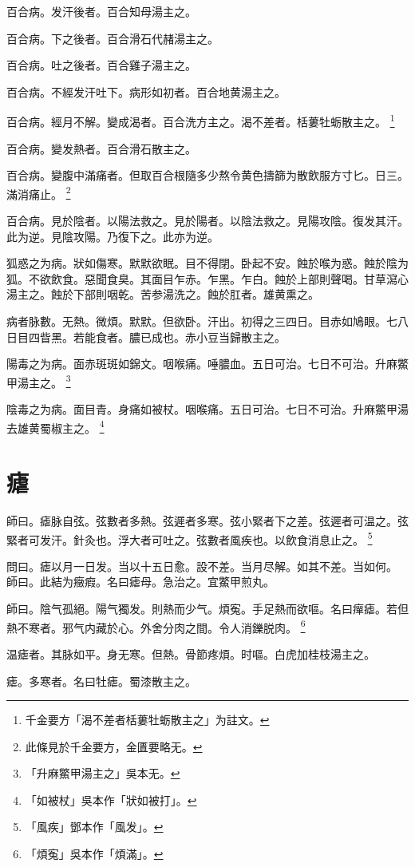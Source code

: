 百合病。发汗後者。百合知母湯主之。

百合病。下之後者。百合滑石代赭湯主之。

百合病。吐之後者。百合雞子湯主之。

百合病。不經发汗吐下。病形如初者。百合地黄湯主之。

百合病。經月不解。變成渴者。百合洗方主之。渴不差者。栝蔞牡蛎散主之。
	\footnote{千金要方「渴不差者栝蔞牡蛎散主之」为註文。}

百合病。變发熱者。百合滑石散主之。

百合病。變腹中滿痛者。但取百合根隨多少熬令黄色擣篩为散飲服方寸匕。日三。滿消痛止。
	\footnote{此條見於千金要方，金匱要略无。}

百合病。見於陰者。以陽法救之。見於陽者。以陰法救之。見陽攻陰。復发其汗。此为逆。見陰攻陽。乃復下之。此亦为逆。

狐惑之为病。狀如傷寒。默默欲眠。目不得閉。卧起不安。蝕於喉为惑。蝕於陰为狐。不欲飲食。惡聞食臭。其面目乍赤。乍黑。乍白。蝕於上部則聲喝。甘草瀉心湯主之。蝕於下部則咽乾。苦参湯洗之。蝕於肛者。雄黄熏之。

病者脉數。无熱。微煩。默默。但欲卧。汗出。初得之三四日。目赤如鳩眼。七八日目四眥黑。若能食者。膿已成也。赤{\khaaitp 小}豆当歸散主之。

陽毒之为病。面赤斑斑如錦文。咽喉痛。唾膿血。五日可治。七日不可治。升麻鱉甲湯主之。
	\footnote{「升麻鱉甲湯主之」吳本无。}

陰毒之为病。面目青。身痛如被杖。咽喉痛。五日可治。七日不可治。升麻鱉甲湯去雄黄蜀椒主之。
	\footnote{「如被杖」吳本作「狀如被打」。}

\chapter{瘧}

師曰。瘧脉自弦。弦數者多熱。弦遲者多寒。弦小緊者下之差。弦遲者可温之。弦緊者可发汗。針灸也。浮大者可吐之。弦數者風疾也。以飲食消息止之。
	\footnote{「風疾」鄧本作「風发」。}

問曰。瘧以月一日发。当以十五日愈。設不差。当月尽解。如其不差。当如何。\\
師曰。此結为癥瘕。名曰瘧母。急治之。宜鱉甲煎丸。

師曰。陰气孤絕。陽气獨发。則熱而少气。煩寃。手足熱而欲嘔。名曰癉瘧。若但熱不寒者。邪气内藏於心。外舍分肉之間。令人消鑠脱肉。
	\footnote{「煩寃」吳本作「煩滿」。}

温瘧者。其脉如平。身无寒。但熱。骨節疼煩。时嘔。白虎加桂枝湯主之。

瘧。多寒者。名曰牡瘧。蜀漆散主之。

